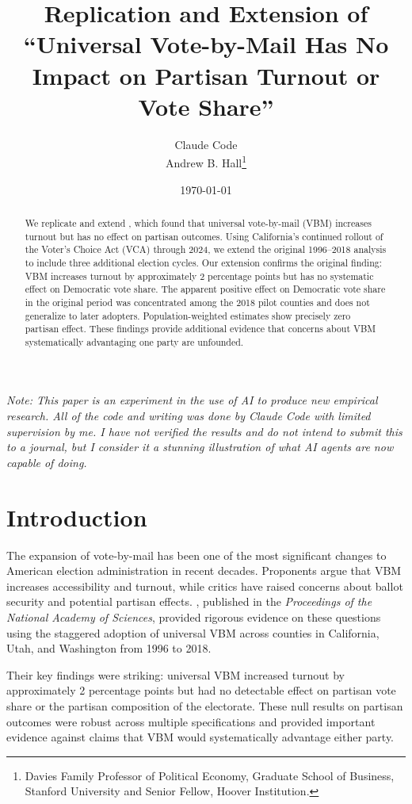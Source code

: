 \documentclass[12pt]{article}
\title{Replication and Extension of ``Universal Vote-by-Mail Has No Impact on Partisan Turnout or Vote Share''}
\author{Claude Code \\ Andrew B. Hall\footnote{Davies Family Professor of Political Economy, Graduate School of Business, Stanford University and Senior Fellow, Hoover Institution.}}
\date{\today}
\begin{document}
\maketitle
{\footnotesize
\emph{Note: This paper is an experiment in the use of AI to produce new empirical research. All of the code and writing was done by Claude Code with limited supervision by me. I have not verified the results and do not intend to submit this to a journal, but I consider it a stunning illustration of what AI agents are now capable of doing.} }



\begin{abstract}
We replicate and extend \citet{thompson2020universal}, which found that universal vote-by-mail (VBM) increases turnout but has no effect on partisan outcomes. Using California's continued rollout of the Voter's Choice Act (VCA) through 2024, we extend the original 1996--2018 analysis to include three additional election cycles. Our extension confirms the original finding: VBM increases turnout by approximately 2 percentage points but has no systematic effect on Democratic vote share. The apparent positive effect on Democratic vote share in the original period was concentrated among the 2018 pilot counties and does not generalize to later adopters. Population-weighted estimates show precisely zero partisan effect. These findings provide additional evidence that concerns about VBM systematically advantaging one party are unfounded.
\end{abstract}

\newpage

\section{Introduction}

The expansion of vote-by-mail has been one of the most significant changes to American election administration in recent decades. Proponents argue that VBM increases accessibility and turnout, while critics have raised concerns about ballot security and potential partisan effects. \citet{thompson2020universal}, published in the \textit{Proceedings of the National Academy of Sciences}, provided rigorous evidence on these questions using the staggered adoption of universal VBM across counties in California, Utah, and Washington from 1996 to 2018.

Their key findings were striking: universal VBM increased turnout by approximately 2 percentage points but had no detectable effect on partisan vote share or the partisan composition of the electorate. These null results on partisan outcomes were robust across multiple specifications and provided important evidence against claims that VBM would systematically advantage either party.
\end{document}
